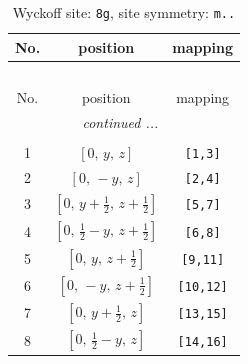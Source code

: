 \documentclass[fleqn,8pt]{jsarticle}
\begin{document}
\begin{longtable}{ccc}
\caption{Wyckoff site: {\tt 8g}, site symmetry: {\tt m..}}
 \\
 \hline \hline
No. & position & mapping \\ \hline \endfirsthead

\multicolumn{2}{l}{\tablename\ \thetable{}} \\
 \hline \hline
No. & position & mapping \\ \hline \endhead

 \hline \hline
\multicolumn{2}{r}{\footnotesize\it continued ...} \\ \endfoot

 \hline \hline
\multicolumn{2}{r}{} \\ \endlastfoot

1 & $\left[ 0,\, y,\, z \right]$ & {\tt [1,3]} \\ \hline
2 & $\left[ 0,\, - y,\, z \right]$ & {\tt [2,4]} \\ \hline
3 & $\left[ 0,\, y + \frac{1}{2},\, z + \frac{1}{2} \right]$ & {\tt [5,7]} \\ \hline
4 & $\left[ 0,\, \frac{1}{2} - y,\, z + \frac{1}{2} \right]$ & {\tt [6,8]} \\ \hline
5 & $\left[ 0,\, y,\, z + \frac{1}{2} \right]$ & {\tt [9,11]} \\ \hline
6 & $\left[ 0,\, - y,\, z + \frac{1}{2} \right]$ & {\tt [10,12]} \\ \hline
7 & $\left[ 0,\, y + \frac{1}{2},\, z \right]$ & {\tt [13,15]} \\ \hline
8 & $\left[ 0,\, \frac{1}{2} - y,\, z \right]$ & {\tt [14,16]} \\
\end{longtable}
\renewcommand{\arraystretch}{1.2}
\end{document}
